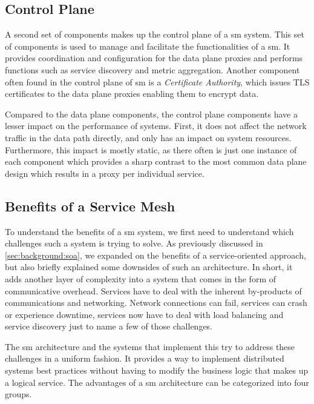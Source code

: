 \subsection{Control Plane}
\label{sec:background:service-mesh:control-plane}

A second set of components makes up the control plane of a \gls{sm} system. This set of components is used to manage and facilitate the functionalities of a \gls{sm}. It provides coordination and configuration for the data plane proxies and performs functions such as service discovery and metric aggregation. Another component often found in the control plane of \gls{sm} is a \textit{Certificate Authority}, which issues TLS certificates to the data plane proxies enabling them to encrypt data. 

Compared to the data plane components, the control plane components have a lesser impact on the performance of systems. First, it does not affect the network traffic in the data path directly, and only has an impact on system resources. Furthermore, this impact is mostly static, as there often is just one instance of each component which provides a sharp contrast to the most common data plane design which results in a proxy per individual service. 

\subsection{Benefits of a Service Mesh}
\label{sec:background:service-mesh:benefits}

To understand the benefits of a \gls{sm} system, we first need to understand which challenges such a system is trying to solve. As previously discussed in \cref{sec:background:soa}, we expanded on the benefits of a service-oriented approach, but also briefly explained some downsides of such an architecture. In short, it adds another layer of complexity into a system that comes in the form of communicative overhead. Services have to deal with the inherent by-products of communications and networking. Network connections can fail, services can crash or experience downtime, services now have to deal with load balancing and service discovery just to name a few of those challenges. 

The \gls{sm} architecture and the systems that implement this try to address these challenges in a uniform fashion. It provides a way to implement distributed systems best practices without having to modify the business logic that makes up a logical service. The advantages of a \gls{sm} architecture can be categorized into four groups.

